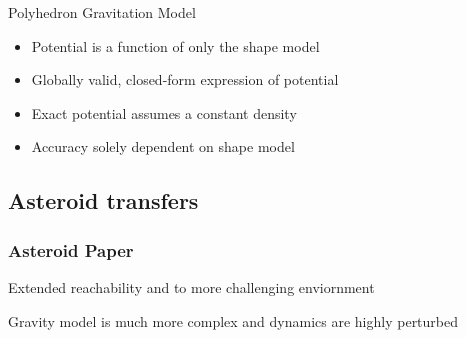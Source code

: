 
\begin{frame}{Polyhedron Gravitation Model}

\begin{itemize}
    \item Potential is a function of only the shape model
    \item Globally valid, closed-form expression of potential
    \item Exact potential assumes a constant density 
    \item Accuracy solely dependent on shape model
\end{itemize}

\end{frame}

\subsection*{Asteroid transfers}

\begin{frame}[t]\frametitle{Asteroid Paper}
    
Extended reachability and \Poincare to more challenging enviornment 

Gravity model is much more complex and dynamics are highly perturbed

\end{frame}

